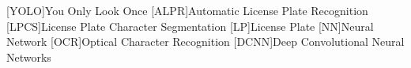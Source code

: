 [YOLO]{You Only Look Once}
[ALPR]{Automatic License Plate Recognition}
[LPCS]{License Plate Character Segmentation}
[LP]{License Plate}
[NN]{Neural Network}
[OCR]{Optical Character Recognition}
[DCNN]{Deep Convolutional Neural Networks}


